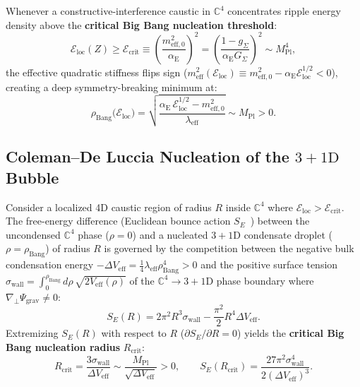\documentclass[11pt,a4paper]{article}
\begin{document}
Whenever a constructive-interference caustic in $\mathbb{C}^4$ concentrates ripple energy density above the \textbf{critical Big Bang nucleation threshold}:
\begin{equation}
\mathcal{E}_{\text{loc}}(Z) \ge \mathcal{E}_{\text{crit}} \equiv \left( \frac{m_{\text{eff},0}^2}{\alpha_{\text{E}}} \right)^2 = \left( \frac{1 - g_\Sigma}{\alpha_{\text{E}} G_\Sigma} \right)^2 \sim M_{\text{Pl}}^4,
\end{equation}
the effective quadratic stiffness flips sign ($m_{\text{eff}}^2(\mathcal{E}_{\text{loc}}) \equiv m_{\text{eff},0}^2 - \alpha_{\text{E}}\mathcal{E}_{\text{loc}}^{1/2} < 0$), creating a deep symmetry-breaking minimum at:
\begin{equation}
\rho_{\text{Bang}}\big(\mathcal{E}_{\text{loc}}\big) = \sqrt{\frac{\alpha_{\text{E}}\, \mathcal{E}_{\text{loc}}^{1/2} - m_{\text{eff},0}^2}{\lambda_{\text{eff}}}} \sim M_{\text{Pl}} > 0.
\end{equation}

\subsection{Coleman--De Luccia Nucleation of the \texorpdfstring{$3+1\text{D}$}{3+1D} Bubble}
Consider a localized 4D caustic region of radius $R$ inside $\mathbb{C}^4$ where $\mathcal{E}_{\text{loc}} > \mathcal{E}_{\text{crit}}$. The free-energy difference (Euclidean bounce action $S_E$~\cite{ColemanDeLuccia1980}) between the uncondensed $\mathbb{C}^4$ phase ($\rho = 0$) and a nucleated $3+1\text{D}$ condensate droplet ($\rho = \rho_{\text{Bang}}$) of radius $R$ is governed by the competition between the negative bulk condensation energy $-\Delta V_{\text{eff}} = \frac{1}{4}\lambda_{\text{eff}}\rho_{\text{Bang}}^4 > 0$ and the positive surface tension $\sigma_{\text{wall}} = \int_0^{\rho_{\text{Bang}}} d\rho\, \sqrt{2 V_{\text{eff}}(\rho)}$ of the $\mathbb{C}^4 \to 3+1\text{D}$ phase boundary where $\nabla_\perp \Psi_{\text{grav}} \neq 0$:
\begin{equation}
S_E(R) = 2\pi^2 R^3 \sigma_{\text{wall}} - \frac{\pi^2}{2} R^4 \Delta V_{\text{eff}}.
\end{equation}
Extremizing $S_E(R)$ with respect to $R$ ($\partial S_E / \partial R = 0$) yields the \textbf{critical Big Bang nucleation radius} $R_{\text{crit}}$:
\begin{equation}
R_{\text{crit}} = \frac{3\sigma_{\text{wall}}}{\Delta V_{\text{eff}}} \sim \frac{M_{\text{Pl}}}{\sqrt{\Delta V_{\text{eff}}}} > 0, \qquad S_E(R_{\text{crit}}) = \frac{27\pi^2 \sigma_{\text{wall}}^4}{2(\Delta V_{\text{eff}})^3}.
\end{equation}
\end{document}

